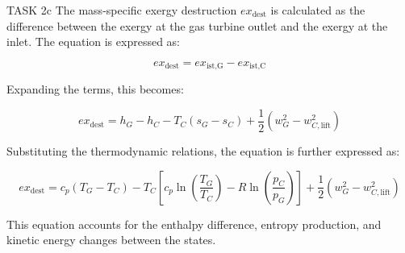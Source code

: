 TASK 2c  
The mass-specific exergy destruction \( ex_{\text{dest}} \) is calculated as the difference between the exergy at the gas turbine outlet and the exergy at the inlet. The equation is expressed as:  

\[
ex_{\text{dest}} = ex_{\text{ist,G}} - ex_{\text{ist,C}}
\]

Expanding the terms, this becomes:  

\[
ex_{\text{dest}} = h_G - h_C - T_C (s_G - s_C) + \frac{1}{2} \left( w_G^2 - w_{C,\text{lift}}^2 \right)
\]

Substituting the thermodynamic relations, the equation is further expressed as:  

\[
ex_{\text{dest}} = c_p (T_G - T_C) - T_C \left[ c_p \ln \left( \frac{T_G}{T_C} \right) - R \ln \left( \frac{p_C}{p_G} \right) \right] + \frac{1}{2} \left( w_G^2 - w_{C,\text{lift}}^2 \right)
\]  

This equation accounts for the enthalpy difference, entropy production, and kinetic energy changes between the states.